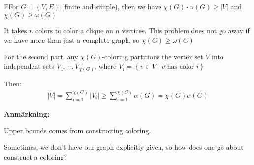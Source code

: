 \par\bigskip
\begin{lem}
  FFor $G = (V,E)$ (finite and simple), then we have $\chi(G)\cdot\alpha(G)\geq\left|V\right|$ and $\chi(G)\geq\omega(G)$
\end{lem}
\newpage
\begin{prf}
  It takes $n$ colors to color a clique on $n$ vertices. This problem does not go away if we have more than just a complete graph, so $\chi(G)\geq\omega(G)$ 
  \par\bigskip
  \noindent For the second part, any $\chi(G)$-coloring partitions the vertex set $V$ into independent sets $V_1,\cdots,V_{\chi(G)}$, where $V_i = \left\{v\in V\;|\;\text{$v$ has color $i$}\right\}$
  \par\bigskip
  \noindent Then:
  \begin{equation*}
    \begin{gathered}
      \left|V\right| = \sum_{i=1}^{\chi(G)}\left|V_i\right|\geq\sum_{i=1}^{\chi(G)}\alpha(G) = \chi(G)\alpha(G)
    \end{gathered}
  \end{equation*}
\end{prf}
\par\bigskip
\noindent\textbf{Anmärkning:}\par
\noindent Upper bounds comes from constructing coloring.
\par\bigskip
\noindent Sometimes, we don't have our graph explicitly given, so how does one go about construct a coloring?
\par\bigskip
